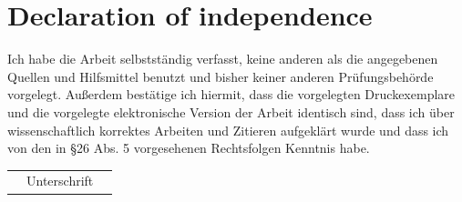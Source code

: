 \documentclass[12pt,twoside]{scrreport}
\begin{document}
\chapter*{Declaration of independence}
Ich habe die Arbeit selbstständig verfasst, keine anderen als die angegebenen Quellen und Hilfsmittel benutzt und bisher keiner anderen Prüfungsbehörde vorgelegt. Außerdem bestätige ich hiermit, dass die vorgelegten Druckexemplare und die vorgelegte elektronische Version der Arbeit identisch sind, dass ich über wissenschaftlich korrektes Arbeiten und Zitieren aufgeklärt wurde und dass ich von den in §26 Abs. 5 vorgesehenen Rechtsfolgen Kenntnis habe.

\vspace{2cm}
\begin{flushright}
	\renewcommand{\arraystretch}{1.3}
	\begin{tabular}{ccc}
		\hline
		\hspace*{2cm}&Unterschrift&\hspace*{2cm}\\
	\end{tabular}
\end{flushright}


\end{document}
